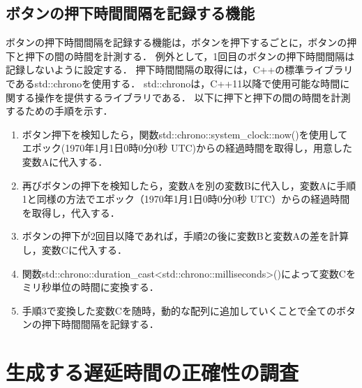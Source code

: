 \subsection{ボタンの押下時間間隔を記録する機能}
ボタンの押下時間間隔を記録する機能は，ボタンを押下するごとに，ボタンの押下と押下の間の時間を計測する．
例外として，1回目のボタンの押下時間間隔は記録しないように設定する．
押下時間間隔の取得には，C++の標準ライブラリであるstd::chronoを使用する．
std::chronoは，C++11以降で使用可能な時間に関する操作を提供するライブラリである．
以下に押下と押下の間の時間を計測するための手順を示す．
\begin{enumerate}[leftmargin=*]
\item ボタン押下を検知したら，関数std::chrono::system\_clock::now()を使用してエポック(1970年1月1日0時0分0秒 UTC)からの経過時間を取得し，用意した変数Aに代入する．
\item 再びボタンの押下を検知したら，変数Aを別の変数Bに代入し，変数Aに手順1と同様の方法でエポック（1970年1月1日0時0分0秒 UTC）からの経過時間を取得し，代入する．
\item ボタンの押下が2回目以降であれば，手順2の後に変数Bと変数Aの差を計算し，変数Cに代入する．
\item 関数std::chrono::duration\_cast\textless std::chrono::milliseconds\textgreater()によって変数Cをミリ秒単位の時間に変換する．
\item 手順3で変換した変数Cを随時，動的な配列に追加していくことで全てのボタンの押下時間間隔を記録する．
\end{enumerate}
\section{生成する遅延時間の正確性の調査}
